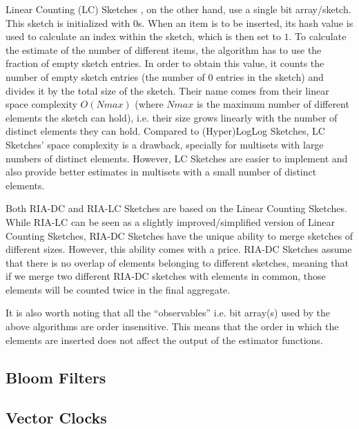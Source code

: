 Linear Counting (LC) Sketches \cite{Whang:1990uh}, on the other hand,
use a single bit array/sketch. This sketch is initialized with $0$s.
When an item is to be inserted, its hash value is used to calculate an
index within the sketch, which is then set to $1$. To calculate the
estimate of the number of different items, the algorithm has to use
the fraction of empty sketch entries. In order to obtain this value,
it counts the number of empty sketch entries (the number of $0$
entries in the sketch) and divides it by the total size of the sketch.
Their name comes from their linear space complexity $O(Nmax)$ (where
$Nmax$ is the maximum number of different elements the sketch can
hold), i.e. their size grows linearly with the number of distinct
elements they can hold. Compared to (Hyper)LogLog Sketches, LC
Sketches' space complexity is a drawback, specially for multisets with
large numbers of distinct elements. However, LC Sketches are easier to
implement and also provide better estimates in multisets with a small
number of distinct elements.

Both RIA-DC and RIA-LC Sketches are based on the Linear Counting
Sketches. While RIA-LC can be seen as a slightly improved/simplified
version of Linear Counting Sketches, RIA-DC Sketches have the unique
ability to merge sketches of different sizes. However, this ability
comes with a price. RIA-DC Sketches assume that there is no overlap of
elements belonging to different sketches, meaning that if we merge two
different RIA-DC sketches with elements in common, those elements will
be counted twice in the final aggregate.

It is also worth noting that all the ``observables'' i.e. bit
array(s) used by the above algorithms are order insensitive.
This means that the order in which the elements are inserted does not
affect the output of the estimator functions.
\subsection{Bloom Filters}
\label{sec:bloom_filters}


\subsection{Vector Clocks}
\label{sec:vector_clocks}

